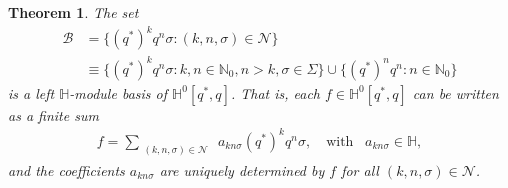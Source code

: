 \documentclass[11pt,a4paper]{amsart}
\newtheorem{theorem}{Theorem}[section]
\theoremstyle{definition}
\begin{document}
\begin{theorem}%
\label{propcanonicalrep}
The set
%
\begin{align*}
\mathcal{B} &= \{(q^{*})^{k} q^{n} \sigma :(k,n,\sigma ) \in
\mathcal{N}\}
\\
& \equiv \{(q^{*})^{k}q^{n}\sigma : k,n\in \mathbb{N}_{0}, n>k ,
\sigma \in \Sigma \} \cup \{(q^{*})^{n}q^{n}: n\in \mathbb{N}_{0}\}
\end{align*}
%
is a left $\mathbb{H}$-module basis of  $\mathbb{H}^{0}[q^{*}, q]$. That
is, each $f\in \mathbb{H}^{0}[q^{*}, q]$ can be written as a finite sum
%
\begin{align}
\label{canonicalrep}
f=\sum _{\substack{(k,n,\sigma )\in \mathcal{N}}} ~ a_{kn\sigma} (q^{*})^{k}
q^{n} \sigma ,\quad \textrm{with}~~~\, a_{kn\sigma} \in \mathbb{H},
\end{align}
%
and the coefficients $a_{kn\sigma} $ are uniquely determined by $f$ for
all $(k, n, \sigma )\in \mathcal{N}$.
\end{theorem}
%
\end{document}
